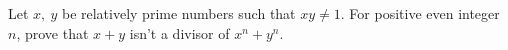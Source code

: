 Let $ x,\ y$ be relatively prime numbers such that $ xy\neq 1$. For positive even integer $ n$, prove that $ x + y$ isn't a divisor of $ x^n + y^n$.